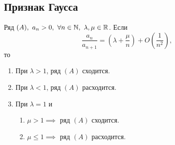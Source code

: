 \subsection{Признак Гаусса}

\begin{theorem}
    Ряд $(A), \ a_n > 0, \ \forall n \in \mathbb{N}, \ \lambda, \mu \in \mathbb{R}$. Если
    \[
        \frac{a_n}{a_{n+1}} = \left(\lambda + \frac{\mu}{n}\right) + O\left(\frac{1}{n^2}\right),
    \]
    то
    \begin{enumerate}
        \item При $\lambda > 1$, ряд $(A)$ сходится.
        \item При $\lambda < 1$, ряд $(A)$ расходится.
        \item При $\lambda = 1$ и \begin{enumerate}
                  \item $\mu > 1 \implies$ ряд $(A)$ сходится.
                  \item $\mu \leqslant 1 \implies$ ряд $(A)$ расходится.
              \end{enumerate}
    \end{enumerate}
\end{theorem}

